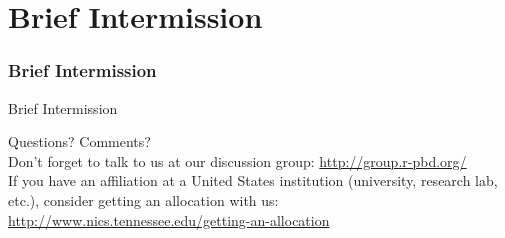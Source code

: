 \section[Break]{Brief Intermission}
\hidenum
\begin{frame}[noframenumbering]
\frametitle{Brief Intermission}
  \begin{block}{Brief Intermission}
  \begin{center}
     {\Large Questions?  Comments?}\\[.6cm]
     Don't forget to talk to us at our discussion group: \url{http://group.r-pbd.org/}\\[.6cm]
     If you have an affiliation at a United States institution (university, research lab, etc.), consider getting an allocation with us:  \\
     \url{http://www.nics.tennessee.edu/getting-an-allocation}
  \end{center}
  \end{block}
\end{frame}
\shownum


